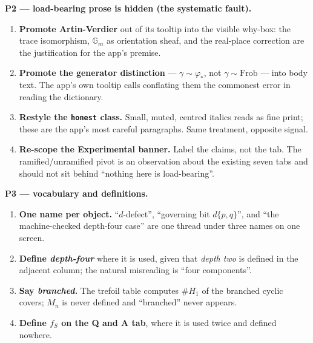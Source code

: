 \textbf{P2 --- load-bearing prose is hidden (the systematic fault).}
\begin{enumerate}[leftmargin=1.4em,itemsep=2pt,resume]
\item \textbf{Promote Artin-Verdier} out of its tooltip into the visible why-box: the trace isomorphism, $\mathbb{G}_m$ as orientation sheaf, and the real-place correction are the justification for the app's premise.
\item \textbf{Promote the generator distinction} --- $\gamma \sim \varphi_*$, not $\gamma \sim \mathrm{Frob}$ --- into body text. The app's own tooltip calls conflating them the commonest error in reading the dictionary.
\item \textbf{Restyle the \texttt{honest} class.} Small, muted, centred italics reads as fine print; these are the app's most careful paragraphs. Same treatment, opposite signal.
\item \textbf{Re-scope the Experimental banner.} Label the claims, not the tab. The ramified/unramified pivot is an observation about the existing seven tabs and should not sit behind ``nothing here is load-bearing''.
\end{enumerate}

\textbf{P3 --- vocabulary and definitions.}
\begin{enumerate}[leftmargin=1.4em,itemsep=2pt,resume]
\item \textbf{One name per object.} ``$d$-defect'', ``governing bit $d\{p,q\}$'', and ``the machine-checked depth-four case'' are one thread under three names on one screen.
\item \textbf{Define \emph{depth-four}} where it is used, given that \emph{depth two} is defined in the adjacent column; the natural misreading is ``four components''.
\item \textbf{Say \emph{branched}.} The trefoil table computes $\#H_1$ of the branched cyclic covers; $M_n$ is never defined and ``branched'' never appears.
\item \textbf{Define $f_S$ on the Q and A tab}, where it is used twice and defined nowhere.
\end{enumerate}

